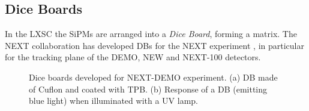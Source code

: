 
%

\subsection{Dice Boards}
\label{sec.dc}

In the LXSC the SiPMs are arranged into a {\em Dice Board}, forming a matrix.
The NEXT collaboration \cite{next} has developed DBs \cite{next13,next12} for the NEXT experiment \cite{jj14}, in particular for the tracking plane of the DEMO, NEW and NEXT-100 detectors. 

\begin{figure}[!htb]
	\centering
	\caption{\label{fig.DB} Dice boards developed for NEXT-DEMO experiment. (a) DB made of Cuflon and coated with TPB. (b) Response of a DB (emitting blue light) when illuminated with a UV lamp.}
\end{figure}

